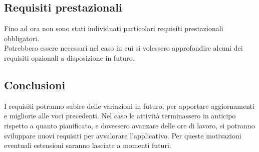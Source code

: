 \subsection{Requisiti prestazionali}
Fino ad ora non sono stati individuati particolari requisiti prestazionali obbligatori.\\
Potrebbero essere necessari nel caso in cui si volessero approfondire alcuni dei requisiti opzionali a disposizione in futuro. 


\subsection{Conclusioni}
I requisiti potranno subire delle variazioni in futuro, per apportare aggiornamenti e migliorie alle voci precedenti.
Nel caso le attività terminassero in anticipo rispetto a quanto pianificato, e dovessero avanzare delle ore di lavoro, si potranno sviluppare nuovi
requisiti per avvalorare l'applicativo. Per queste motivazioni eventuali estensioni saranno lasciate a momenti futuri.